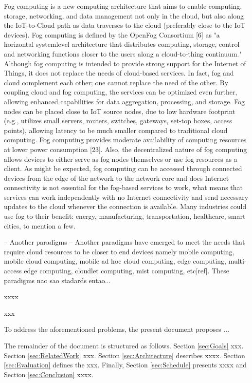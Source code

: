 Fog computing is a new computing architecture that aims to enable computing, storage, networking, and data management not only in the cloud, but also along the IoT-to-Cloud path as data traverses to the cloud (preferably close to the IoT devices). Fog computing is defined by the OpenFog Consortium [6] as "a horizontal systemlevel architecture that distributes computing, storage, control and networking functions closer to the users along a cloud-to-thing continuum." Although fog computing is intended to provide strong support for the Internet of Things, it does not replace the needs of cloud-based services. In fact, fog and cloud complement each other; one cannot replace the need of the other. By coupling cloud and fog computing, the services can be optimized even further, allowing enhanced capabilities for data aggregation, processing, and storage. Fog nodes can be placed close to IoT source nodes, due to low hardware footprint (e.g., utilizes small servers, routers, switches, gateways, set-top boxes, access points), allowing latency to be much smaller compared to traditional cloud computing. Fog computing provides moderate availability of computing resources at lower power consumption [23]. Also, the decentralized nature of fog computing allows devices to either serve as fog nodes themselves or use fog resources as a client. As might be expected, fog computing can be accessed through connected devices from the edge of the network to the network core and does Internet connectivity is not essential for the fog-based services to work, what means that services can work independently with no Internet connectivity and send necessary updates to the cloud whenever the connection is available. Many industries could use fog to their benefit: energy, manufacturing, transportation, healthcare, smart cities, to mention a few.

-- Another paradigms --
Another paradigms have emerged to meet the needs that require cloud resources to be closer to end devices namely mobile computing, mobile cloud computing, mobile ad hoc cloud computing, edge computing, multi-access edge computing, cloudlet computing, mist computing, etc[ref]. These paradigms nao sao stadards entao...

\cite{Armbrust:10}

xxxx

xxx

To address the aforementioned problems, the present document proposes ...


The remainder of the document is structured as follows. Section \ref{sec:Goals} xxx. Section \ref{sec:RelatedWork} xxx. Section \ref{sec:Architecture} describes xxxx. Section \ref{sec:Evaluation} defines the xxx. Finally, Section \ref{sec:Schedule} presents xxxx and Section \ref{sec:Conclusion} xxxx.


